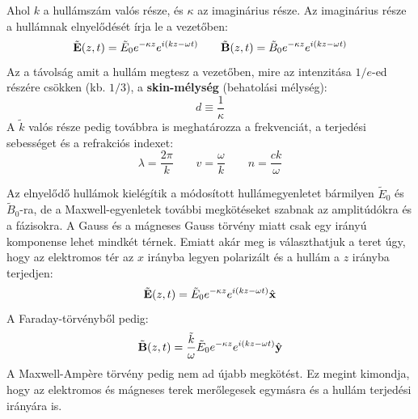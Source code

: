 \documentclass[../main.tex]{subfiles}
\begin{document}
Ahol $k$ a hullámszám valós része, és $\kappa$ az imaginárius része. Az imaginárius része a hullámnak elnyelődését írja le a vezetőben:
\begin{equation}
    \tilde{\bold{E}}(z, t) = \tilde{E}_0 e^{-\kappa z} e^{i(kz - \omega t)} \qquad \tilde{\bold{B}}(z, t) = \tilde{B}_0 e^{-\kappa z} e^{i(kz - \omega t)}
\end{equation}
Az a távolság amit a hullám megtesz a vezetőben, mire az intenzitása $1/e$-ed részére csökken (kb. $1/3$), a \textbf{skin-mélység} (behatolási mélység):
\begin{equation}
    d \equiv \frac{1}{\kappa}
\end{equation}
A $\tilde{k}$ valós része pedig továbbra is meghatározza a frekvenciát, a terjedési sebességet és a refrakciós indexet:
\begin{equation}
    \lambda = \frac{2\pi}{k} \qquad v = \frac{\omega}{k} \qquad n = \frac{ck}{\omega}
\end{equation}

Az elnyelődő hullámok kielégítik a módosított hullámegyenletet bármilyen $\tilde{E}_0$ és $\tilde{B}_0$-ra, de a Maxwell-egyenletek további megkötéseket szabnak az amplitúdókra és a fázisokra.
A Gauss és a mágneses Gauss törvény miatt csak egy irányú komponense lehet mindkét térnek. Emiatt akár meg is választhatjuk a teret úgy, hogy az elektromos tér az $x$ irányba legyen polarizált és a hullám a $z$ irányba terjedjen:
\begin{equation}
    \tilde{\bold{E}}(z, t) = \tilde{E}_0 e^{-\kappa z} e^{i(kz - \omega t)} \hat{\bold{x}}
\end{equation}
A Faraday-törvényből pedig:
\begin{equation}
    \tilde{\bold{B}}(z, t) = \frac{\tilde{k}}{\omega} \tilde{E}_0 e^{-\kappa z} e^{i(kz - \omega t)} \hat{\bold{y}}
\end{equation}
A Maxwell-Ampère törvény pedig nem ad újabb megkötést. Ez megint kimondja, hogy az elektromos és mágneses terek merőlegesek egymásra és a hullám terjedési irányára is.
\end{document}
